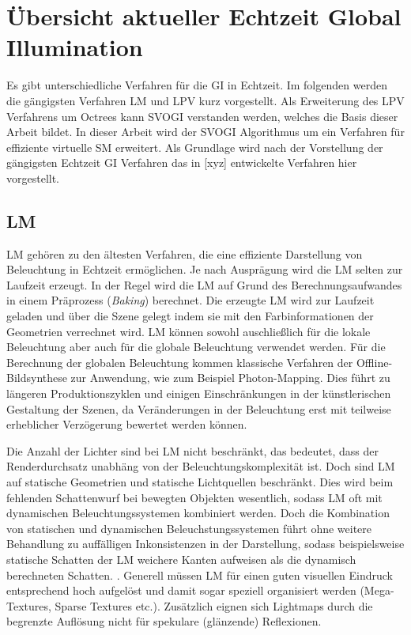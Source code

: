 \chapter{Übersicht aktueller Echtzeit Global Illumination}
\label{chap:uebersicht}

Es gibt unterschiedliche Verfahren für die \ac{GI} in Echtzeit. Im folgenden werden die gängigsten Verfahren \ac{LM} und \ac{LPV} kurz vorgestellt. Als Erweiterung des \ac{LPV} Verfahrens um Octrees kann \ac{SVOGI} verstanden werden, welches die Basis dieser Arbeit bildet. In dieser Arbeit wird der SVOGI Algorithmus um ein Verfahren für effiziente virtuelle \acf{SM} erweitert. Als Grundlage wird nach der Vorstellung der gängigsten Echtzeit \ac{GI} Verfahren das in [xyz] entwickelte Verfahren hier vorgestellt.

\section{\acf{LM}}
\acf{LM} gehören zu den ältesten Verfahren, die eine effiziente Darstellung von Beleuchtung in Echtzeit ermöglichen. Je nach Ausprägung wird die \ac{LM} selten zur Laufzeit erzeugt. In der Regel wird die \ac{LM} auf Grund des Berechnungsaufwandes in einem Präprozess (\textit{Baking}) berechnet. Die erzeugte \ac{LM} wird zur Laufzeit geladen und über die Szene gelegt indem sie mit den Farbinformationen der Geometrien verrechnet wird. \ac{LM} können sowohl auschließlich für die lokale Beleuchtung aber auch für die globale Beleuchtung verwendet werden. Für die Berechnung der globalen Beleuchtung kommen klassische Verfahren der Offline-Bildsynthese zur Anwendung, wie zum Beispiel Photon-Mapping.  Dies führt zu längeren Produktionszyklen  und einigen Einschränkungen in der künstlerischen Gestaltung der Szenen, da Veränderungen in der Beleuchtung erst mit teilweise erheblicher Verzögerung bewertet werden können. 

Die Anzahl der Lichter sind bei \ac{LM} nicht beschränkt, das bedeutet, dass der Renderdurchsatz  unabhäng von der Beleuchtungskomplexität ist. Doch sind \ac{LM} auf statische Geometrien und statische Lichtquellen beschränkt. Dies wird beim fehlenden Schattenwurf bei bewegten Objekten wesentlich, sodass \ac{LM} oft mit dynamischen Beleuchtungssystemen kombiniert werden. Doch die Kombination von statischen und dynamischen Beleuchstungssystemen führt ohne weitere Behandlung zu auffälligen Inkonsistenzen in der Darstellung, sodass beispielsweise statische Schatten der \ac{LM} weichere Kanten aufweisen als die dynamisch berechneten Schatten. \cite{cryenginesdk:lighting}. Generell müssen \ac{LM} für einen guten visuellen Eindruck entsprechend hoch aufgelöst und damit sogar speziell organisiert werden (Mega-Textures, Sparse Textures etc.). Zusätzlich eignen sich Lightmaps durch die begrenzte Auflösung nicht für spekulare (glänzende) Reflexionen.

